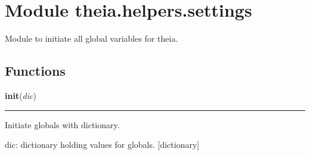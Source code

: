 %
%
%


\section{Module theia.helpers.settings}

    \label{theia:helpers:settings}
Module to initiate all global variables for theia.



  \subsection{Functions}

    \label{theia:helpers:settings:init}

    \vspace{0.5ex}

\hspace{.8\funcindent}\begin{boxedminipage}{\funcwidth}

    \raggedright \textbf{init}(\textit{dic})

    \vspace{-1.5ex}

    \rule{\textwidth}{0.5\fboxrule}
\setlength{\parskip}{2ex}
    Initiate globals with dictionary.

    dic: dictionary holding values for globals. [dictionary]

\setlength{\parskip}{1ex}
    \end{boxedminipage}




